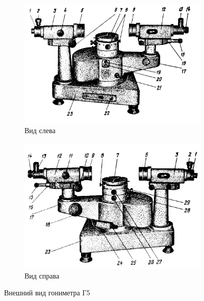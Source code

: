 \newpage
\begin{figure}[h!]
    \centering
    \begin{subfigure}{0.6\textwidth}
        \centering
        \includegraphics[width=13cm]{images/gonimetr.png}
        \caption{Вид слева}
    \end{subfigure}
    \begin{subfigure}{0.6\textwidth}
        \centering
        \includegraphics[width=13cm]{images/setup2.png}
        \caption{Вид справа}
    \end{subfigure}
    \caption{Внешний вид гониметра Г5} \label{figure:gonimetr}
\end{figure}

\newpage
